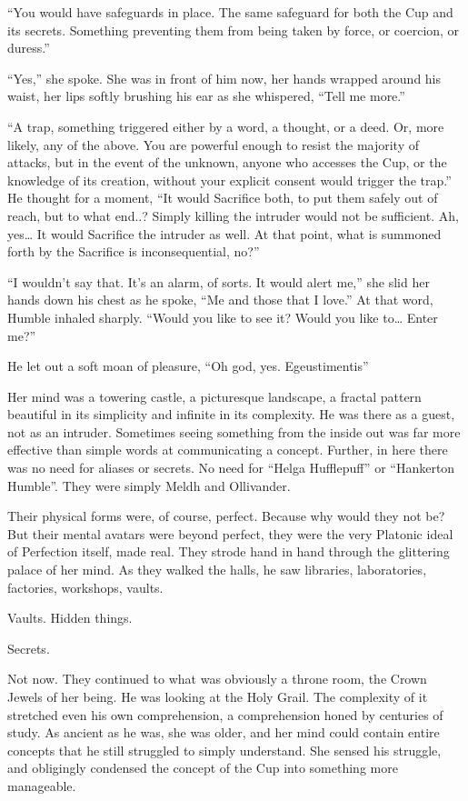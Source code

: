 “You would have safeguards in place. The same safeguard for both the Cup and its secrets. Something preventing them from being taken by force, or coercion, or duress.”

“Yes,” she spoke. She was in front of him now, her hands wrapped around his waist, her lips softly brushing his ear as she whispered, “Tell me more.”

“A trap, something triggered either by a word, a thought, or a deed. Or, more likely, any of the above. You are powerful enough to resist the majority of attacks, but in the event of the unknown, anyone who accesses the Cup, or the knowledge of its creation, without your explicit consent would trigger the trap.” He thought for a moment, “It would Sacrifice both, to put them safely out of reach, but to what end..? Simply killing the intruder would not be sufficient. Ah, yes… It would Sacrifice the intruder as well. At that point, what is summoned forth by the Sacrifice is inconsequential, no?”

“I wouldn’t say that. It’s an alarm, of sorts. It would alert me,” she slid her hands down his chest as he spoke, “Me and those that I love.” At that word, Humble inhaled sharply. “Would you like to see it? Would you like to… Enter me?”

He let out a soft moan of pleasure, “Oh god, yes. Egeustimentis”

Her mind was a towering castle, a picturesque landscape, a fractal pattern beautiful in its simplicity and infinite in its complexity. He was there as a guest, not as an intruder. Sometimes seeing something from the inside out was far more effective than simple words at communicating a concept. Further, in here there was no need for aliases or secrets. No need for “Helga Hufflepuff” or “Hankerton Humble”. They were simply Meldh and Ollivander.

Their physical forms were, of course, perfect. Because why would they not be? But their mental avatars were beyond perfect, they were the very Platonic ideal of Perfection itself, made real. They strode hand in hand through the glittering palace of her mind. As they walked the halls, he saw libraries, laboratories, factories, workshops, vaults.

Vaults. Hidden things.

Secrets.

Not now. They continued to what was obviously a throne room, the Crown Jewels of her being. He was looking at the Holy Grail. The complexity of it stretched even his own comprehension, a comprehension honed by centuries of study. As ancient as he was, she was older, and her mind could contain entire concepts that he still struggled to simply understand. She sensed his struggle, and obligingly condensed the concept of the Cup into something more manageable.

